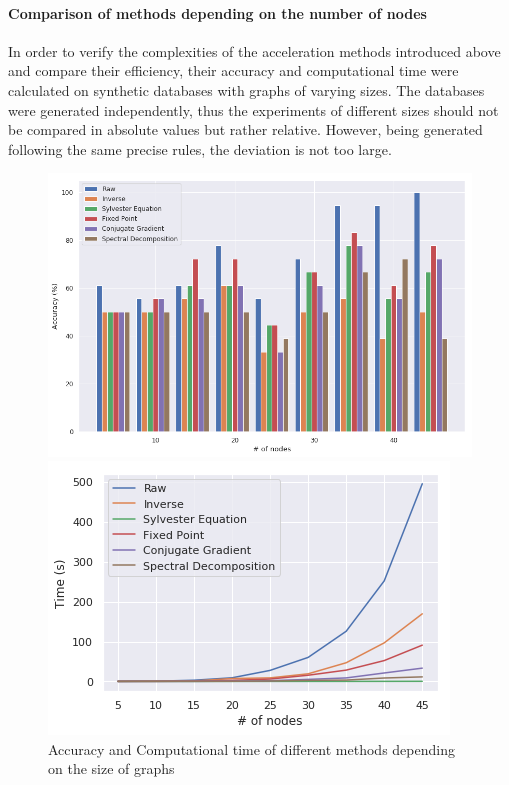 \documentclass{article}
\theoremstyle{definition}
\begin{document}
\paragraph{Comparison of methods depending on the number of nodes}
In order to verify the complexities of the acceleration methods introduced above and compare their efficiency, their accuracy and computational time were calculated on synthetic databases with graphs of varying sizes. The databases were generated independently, thus the experiments of different sizes should not be compared in absolute values but rather relative. However, being generated following the same precise rules, the deviation is not too large.
\begin{figure}[!htb]
	\begin{multicols}{2}
		\includegraphics[width=\linewidth]{data/nb_nodes/acc.png}\par
		\includegraphics[width=\linewidth]{data/nb_nodes/time.png}\par
	\end{multicols}
\caption{Accuracy and Computational time of different methods depending on the size of graphs}
\end{figure}
\end{document}
